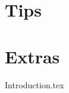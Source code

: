 \documentclass[11pt]{book}
\begin{document}
\part{Tips}

  


\part{Extras}
{Introduction.tex}


\backmatter 

% 

\printindex %
\end{document}
